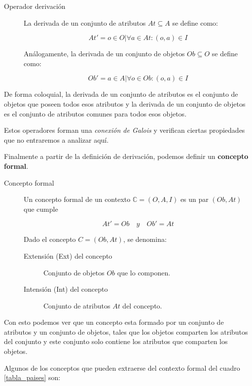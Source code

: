 	\begin{description}
		\item[Operador derivación] La derivada de un conjunto de atributos $At \subseteq A$ se define como: 
		
		\[ At' = {o \in O | \forall a \in At : (o, a) \in I} \]
		
		Análogamente, la derivada de un conjunto de objetos $Ob \subseteq O$ se define como:
		
		\[ Ob' = {a \in A | \forall o \in Ob : (o, a) \in I} \]
		
	\end{description}

	De forma coloquial, la derivada de un conjunto de atributos es el conjunto de objetos que poseen todos esos atributos y la derivada de un conjunto de objetos es el conjunto de atributos comunes para todos esos objetos.
	
	Estos operadores forman una \textit{conexión de Galois} y verifican ciertas propiedades que no entraremos a analizar aquí.
	
	
	Finalmente a partir de la definición de derivación, podemos definir un \textbf{concepto formal}.
	
	\begin{description}
		\item[Concepto formal] Un concepto formal de un contexto $\mathbb{C} = (O,A,I)$ es un par $(Ob,At)$ que cumple
		
		\[ At' = Ob \quad y \quad Ob' = At		\] 
		
		Dado el concepto $C = (Ob, At)$, se denomina: 
		\begin{description}
			\item[Extensión (Ext) del concepto] Conjunto de objetos $Ob$ que lo componen.
			\item[Intensión (Int) del concepto] Conjunto de atributos $At$ del concepto. 
		\end{description}
	\end{description}
	
	Con esto podemos ver que un concepto esta formado por un conjunto de atributos y un conjunto de objetos, tales que los objetos comparten los atributos del conjunto y este conjunto solo contiene los atributos que comparten los objetos.
	
	Algunos de los conceptos que pueden extraerse del contexto formal del cuadro \ref{tabla_paises} son:
	
